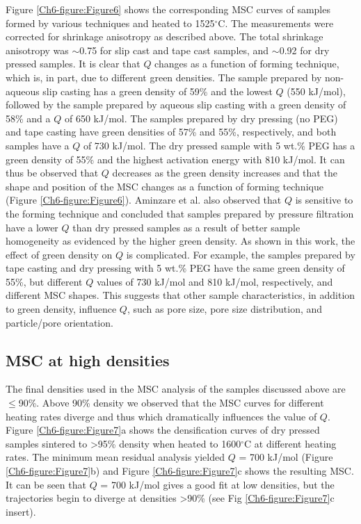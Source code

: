 Figure \ref{Ch6-figure:Figure6} shows the corresponding MSC curves of samples formed by various techniques and heated to 1525$^{\circ}$C. The measurements were corrected for shrinkage anisotropy as described above. The total shrinkage anisotropy was $\sim$0.75 for slip cast and tape cast samples, and $\sim$0.92 for dry pressed samples. It is clear that $Q$ changes as a function of forming technique, which is, in part, due to different green densities. The sample prepared by non-aqueous slip casting has a green density of 59\% and the lowest $Q$ (550 kJ/mol), followed by the sample prepared by aqueous slip casting with a green density of 58\% and a $Q$ of 650 kJ/mol. The samples prepared by dry pressing (no PEG) and tape casting have green densities of 57\% and 55\%, respectively, and both samples have a $Q$ of 730 kJ/mol. The dry pressed sample with 5 wt.\% PEG has a green density of 55\% and the highest activation energy with 810 kJ/mol. It can thus be observed that $Q$ decreases as the green density increases and that the shape and position of the MSC changes as a function of forming technique (Figure \ref{Ch6-figure:Figure6}). Aminzare et al. \cite{Aminzare2010} also observed that $Q$ is sensitive to the forming technique and concluded that samples prepared by pressure filtration have a lower $Q$ than dry pressed samples as a result of better sample homogeneity as evidenced by the higher green density. As shown in this work, the effect of green density on $Q$ is complicated. For example, the samples prepared by tape casting and dry pressing with 5 wt.\% PEG have the same green density of 55\%, but different $Q$ values of 730 kJ/mol and 810 kJ/mol, respectively, and different MSC shapes. This suggests that other sample characteristics, in addition to green density, influence $Q$, such as pore size, pore size distribution, and particle/pore orientation. 

\subsection{MSC at high densities}
The final densities used in the MSC analysis of the samples discussed above are $\leq$90\%. Above 90\% density we observed that the MSC curves for different heating rates diverge and thus which dramatically influences the value of $Q$. Figure \ref{Ch6-figure:Figure7}a shows the densification curves of dry pressed samples sintered to >95\% density when heated to 1600$^{\circ}$C at different heating rates. The minimum mean residual analysis yielded $Q$ = 700 kJ/mol (Figure \ref{Ch6-figure:Figure7}b) and Figure \ref{Ch6-figure:Figure7}c shows the resulting MSC. It can be seen that $Q$ = 700 kJ/mol gives a good fit at low densities, but the trajectories begin to diverge at densities >90\% (see Fig \ref{Ch6-figure:Figure7}c insert). 

